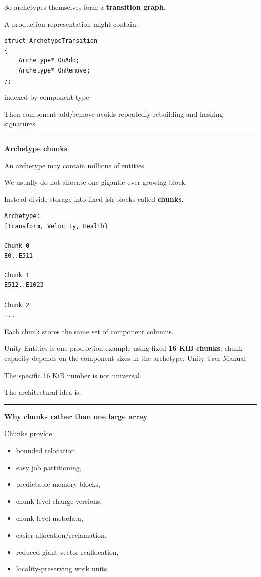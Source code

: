 So archetypes themselves form a \textbf{transition graph}.

A production representation might contain:

\begin{verbatim}
struct ArchetypeTransition
{
    Archetype* OnAdd;
    Archetype* OnRemove;
};
\end{verbatim}

indexed by component type.

Then component add/remove avoids repeatedly rebuilding and hashing signatures.

\begin{center}\rule{0.5\linewidth}{0.5pt}\end{center}

\textbf{Archetype chunks}

An archetype may contain millions of entities.

We usually do not allocate one gigantic ever-growing block.

Instead divide storage into fixed-ish blocks called \textbf{chunks}.

\begin{verbatim}
Archetype:
{Transform, Velocity, Health}

Chunk 0
E0..E511

Chunk 1
E512..E1023

Chunk 2
...
\end{verbatim}

Each chunk stores the same set of component columns.

Unity Entities is one production example using fixed \textbf{16 KiB chunks}; chunk capacity depends on the component sizes in the archetype. \href{https://docs.unity.cn/Packages/com.unity.entities\%401.0/manual/concepts-archetypes.html?utm_source=chatgpt.com}{Unity User Manual}

The specific 16 KiB number is not universal.

The architectural idea is.

\begin{center}\rule{0.5\linewidth}{0.5pt}\end{center}

\textbf{Why chunks rather than one large array}

Chunks provide:

\begin{itemize}
\tightlist
\item
  bounded relocation,
\item
  easy job partitioning,
\item
  predictable memory blocks,
\item
  chunk-level change versions,
\item
  chunk-level metadata,
\item
  easier allocation/reclamation,
\item
  reduced giant-vector reallocation,
\item
  locality-preserving work units.
\end{itemize}

